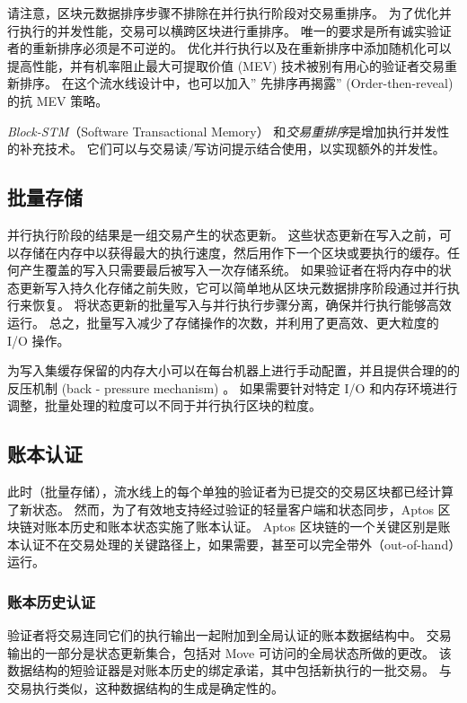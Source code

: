 \documentclass{article}
\begin{document}
请注意，区块元数据排序步骤不排除在并行执行阶段对交易重排序。 为了优化并行执行的并发性能，交易可以横跨区块进行重排序。 唯一的要求是所有诚实验证者的重新排序必须是不可逆的。 优化并行执行以及在重新排序中添加随机化可以提高性能，并有机率阻止最大可提取价值 (MEV) 技术被别有用心的验证者交易重新排序。 在这个流水线设计中，也可以加入” 先排序再揭露” (Order-then-reveal) 的抗 MEV 策略。

\emph{Block-STM}（Software Transactional Memory） 和\emph{交易重排序}是增加执行并发性的补充技术。 它们可以与交易读/写访问提示结合使用，以实现额外的并发性。

\subsection{批量存储}
并行执行阶段的结果是一组交易产生的状态更新。 这些状态更新在写入之前，可以存储在内存中以获得最大的执行速度，然后用作下一个区块或要执行的缓存。任何产生覆盖的写入只需要最后被写入一次存储系统。 如果验证者在将内存中的状态更新写入持久化存储之前失败，它可以简单地从区块元数据排序阶段通过并行执行来恢复。 将状态更新的批量写入与并行执行步骤分离，确保并行执行能够高效运行。 总之，批量写入减少了存储操作的次数，并利用了更高效、更大粒度的 I/O 操作。

为写入集缓存保留的内存大小可以在每台机器上进行手动配置，并且提供合理的的反压机制 (back - pressure mechanism) 。 如果需要针对特定 I/O 和内存环境进行调整，批量处理的粒度可以不同于并行执行区块的粒度。

\subsection{账本认证}

此时（批量存储），流水线上的每个单独的验证者为已提交的交易区块都已经计算了新状态。 然而，为了有效地支持经过验证的轻量客户端和状态同步，Aptos 区块链对账本历史和账本状态实施了账本认证。 Aptos 区块链的一个关键区别是账本认证不在交易处理的关键路径上，如果需要，甚至可以完全带外（out-of-hand）运行。


\subsubsection{账本历史认证}
\label{subsubsec:ledger_history_certification}

验证者将交易连同它们的执行输出一起附加到全局认证的账本数据结构中。 交易输出的一部分是状态更新集合，包括对 Move 可访问的全局状态所做的更改。 该数据结构的短验证器是对账本历史的绑定承诺，其中包括新执行的一批交易。 与交易执行类似，这种数据结构的生成是确定性的。
\end{document}
